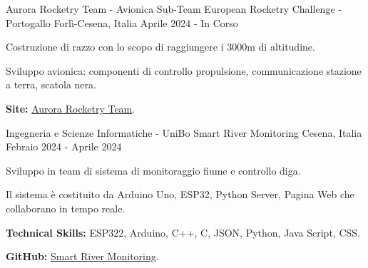 

\begin{cventries}

    \cventry
    {Aurora Rocketry Team - Avionica Sub-Team} %
    {European Rocketry Challenge - Portogallo} %
    {Forlì-Cesena, Italia} %
    {Aprile 2024 - In Corso} %
    {
      \begin{cvitems} %
        \item {Costruzione di razzo con lo scopo di raggiungere i 3000m di altitudine.}
        \item {Sviluppo avionica: componenti di controllo propulsione, communicazione stazione a terra, scatola nera.}
        \item {\textbf{Site:} \href{https://www.aurorarocketry.eu/}{Aurora Rocketry Team}.}
      \end{cvitems}
    }

    \cventry
    {Ingegneria e Scienze Informatiche - UniBo} %
    {Smart River Monitoring} %
    {Cesena, Italia} %
    {Febraio 2024 - Aprile 2024} %
    {
    \begin{cvitems} %
        \item {Sviluppo in team di sistema di monitoraggio fiume e controllo diga.}
        \item {Il sistema è costituito da Arduino Uno, ESP32, Python Server, Pagina Web che collaborano in tempo reale.}
        \item {\textbf{Technical Skills:} ESP322, Arduino, C++, C, JSON, Python, Java Script, CSS.}
        \item {\textbf{GitHub:} \href{https://github.com/elvisperlika/Smart-River-Monitoring.git}{Smart River Monitoring}.}
    \end{cvitems}
    }


\end{cventries}

